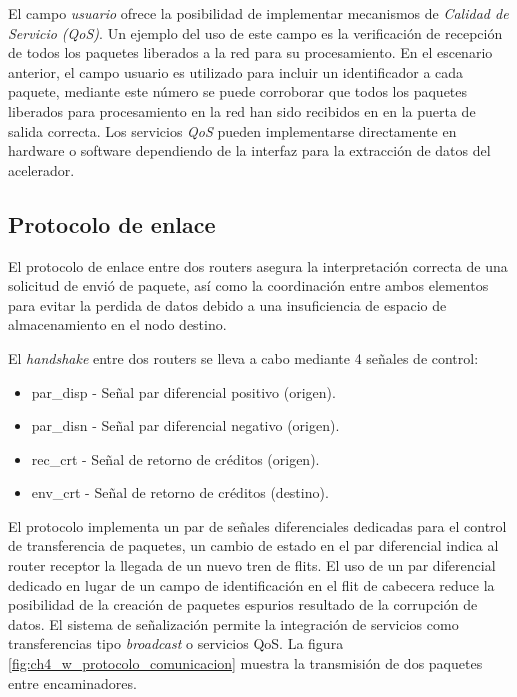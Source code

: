 El campo \textit{usuario} ofrece la posibilidad de implementar mecanismos de \textit{Calidad de Servicio (QoS)}. Un ejemplo del uso de este campo es la verificación de recepción de todos los paquetes liberados a la red para su procesamiento. En el escenario anterior, el campo usuario es utilizado para incluir un identificador a cada paquete, mediante este número se puede corroborar que todos los paquetes liberados para procesamiento en la red han sido recibidos en en la puerta de salida correcta. Los servicios \textit{QoS} pueden implementarse directamente en hardware o software dependiendo de la interfaz para la extracción de datos del acelerador.










\subsection{Protocolo de enlace}
	\label{subsec:protocolo_de_enlace}

El protocolo de enlace entre dos routers asegura la interpretación correcta de una solicitud de envió de paquete, así como la coordinación entre ambos elementos para evitar la perdida de datos debido a una insuficiencia de espacio de almacenamiento en el nodo destino.

El \textit{handshake} entre dos routers se lleva a cabo mediante 4 señales de control:

\begin{itemize}[noitemsep]
	\item par\_disp - Señal par diferencial positivo (origen). 
	\item par\_disn - Señal par diferencial negativo (origen).
	\item rec\_crt  - Señal de retorno de créditos (origen).
	\item env\_crt  - Señal de retorno de créditos (destino).
\end{itemize}


El protocolo implementa un par de señales diferenciales dedicadas para el control de transferencia de paquetes, un cambio de estado en el par diferencial indica al router receptor la llegada de un nuevo tren de flits. El uso de un par diferencial dedicado en lugar de un campo de identificación en el flit de cabecera reduce la posibilidad de la creación de paquetes espurios resultado de la corrupción de datos. El sistema de señalización permite la integración de servicios como transferencias tipo \textit{broadcast} o servicios QoS. La figura \ref{fig:ch4_w_protocolo_comunicacion} muestra la transmisión de dos paquetes entre encaminadores.


